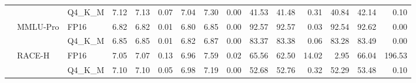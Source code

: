 \begin{table}[t]
{\begin{tabular}{lllrrrrrrrrrrrr}
 &  & Q4\_K\_M & 7.12 & 7.13 & 0.07 & 7.04 & 7.30 & 0.00 & 41.53 & 41.48 & 0.31 & 40.84 & 42.14 & 0.10 \\
 & MMLU-Pro & FP16 & 6.82 & 6.82 & 0.01 & 6.80 & 6.85 & 0.00 & 92.57 & 92.57 & 0.03 & 92.54 & 92.62 & 0.00 \\
 &  & Q4\_K\_M & 6.85 & 6.85 & 0.01 & 6.82 & 6.87 & 0.00 & 83.37 & 83.38 & 0.06 & 83.28 & 83.49 & 0.00 \\
 & RACE-H & FP16 & 7.05 & 7.07 & 0.13 & 6.96 & 7.59 & 0.02 & 65.56 & 62.50 & 14.02 & 2.95 & 66.04 & 196.53 \\
 &  & Q4\_K\_M & 7.10 & 7.10 & 0.05 & 6.98 & 7.19 & 0.00 & 52.68 & 52.76 & 0.32 & 52.29 & 53.48 & 0.10 \\
\bottomrule
\end{tabular}
}
\end{table}
